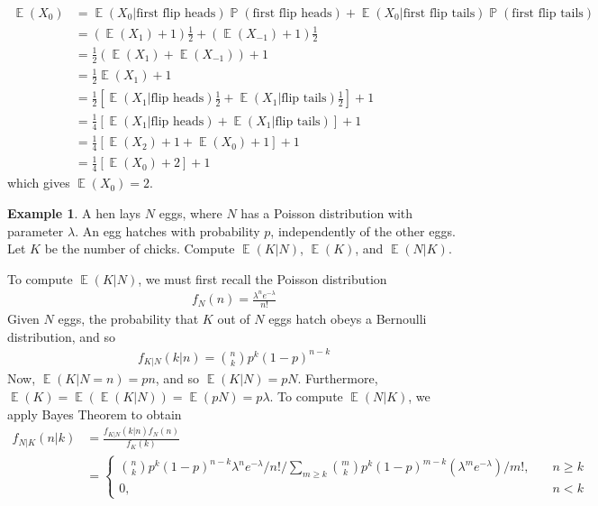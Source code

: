 \documentclass[12pt]{amsbook}
\DeclareMathOperator{\ex}{\mathbb{E}}
\DeclareMathOperator{\prob}{\mathbb{P}}
\theoremstyle{plain}
\theoremstyle{definition}
\newtheorem*{example}{Example}
\theoremstyle{remark}
\numberwithin{equation}{section}  %
\begin{document}
	\begin{align*}
		\ex(X_0) & = \ex(X_0 | \text{first flip heads})\prob(\text{first flip heads}) +
		\ex(X_0 | \text{first flip tails}) \prob(\text{first flip tails})
		\\
		& = (\ex(X_1) + 1) \frac{1}{2} + (\ex(X_{-1}) + 1) \frac{1}{2}
		\\
		& = \frac{1}{2}(\ex(X_1) + \ex(X_{-1})) + 1
		\\
		& = \frac{1}{2}\ex(X_1) + 1
		\\
		& = \frac{1}{2}[\ex(X_1 | \text{flip heads}) \frac{1}{2} + \ex(X_1 | \text{flip
		tails}) \frac{1}{2}] + 1
		\\
		& = \frac{1}{4}[\ex(X_1 | \text{flip heads}) + \ex(X_1 | \text{flip
		tails})] + 1
		\\
		& = \frac{1}{4} [ \ex(X_2) + 1  + \ex(X_0) + 1] + 1
		\\
		& = \frac{1}{4}[ \ex(X_0) + 2] + 1
	\end{align*}
	which gives $\ex(X_0) = 2$.
	\begin{example}
		A hen lays $N$ eggs, where $N$ has a Poisson distribution with parameter
		$\lambda$. An egg hatches with probability $p$, independently  of the other
		eggs. Let $K$ be the number of chicks. Compute $\ex(K|N)$, $\ex(K)$, and $\ex(N | 
		K)$.
	\end{example}
	To compute $\ex(K|N)$, we must first recall the Poisson distribution
	\begin{align*}
		f_N(n) = \frac{\lambda^n e^{-\lambda}}{n!}
	\end{align*}
	Given $N$ eggs, the probability that $K$ out of $N$ eggs hatch obeys a 
	Bernoulli distribution, and so 
	\begin{align*}
		f_{K|N}(k|n) = \binom{n}{k} p^k {(1-p)}^{n-k}
	\end{align*}
	Now, $\ex(K | N = n) = pn$, and so $\ex(K | N) = pN$. Furthermore, $\ex(K) = \ex(\ex(K
	| N	)) = \ex(pN) = p \lambda$.
	To compute $\ex(N | K)$, we apply Bayes Theorem to obtain
	\begin{align*}
		f_{N|K}(n|k) & = \frac{f_{K|N}(k|n)f_N(n)}{f_K(k)}
		\\
		& = \begin{cases}
			\binom{n}{k}p^k {(1-p)}^{n-k} \lambda^n
			e^{-\lambda}/n!/\sum_{m \ge k}
			\binom{m}{k} p^k {(1 - p)}^{m-k} (\lambda^m e^{-\lambda})/m!
			, \quad & n \ge k
			\\
			0, \quad & n<k
		\end{cases}
	\end{align*}
\end{document}
